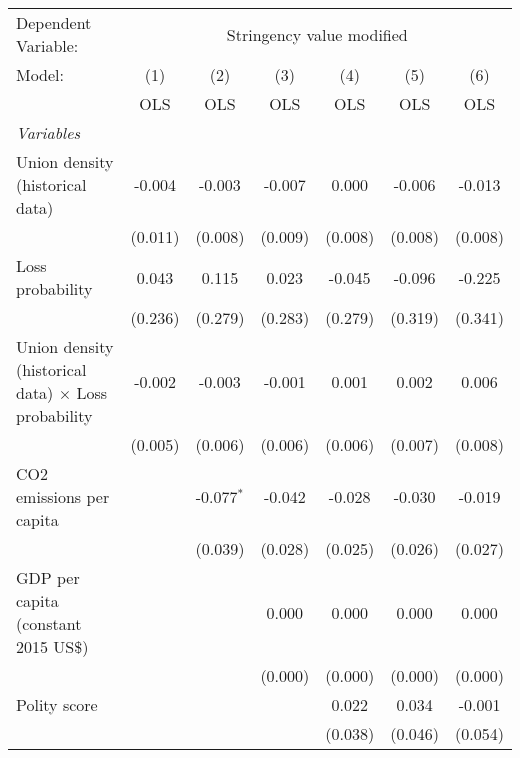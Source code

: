 
\begingroup
\centering
\begin{tabular}{lcccccc}
   \toprule
   Dependent Variable: & \multicolumn{6}{c}{Stringency value modified}\\
   Model:                                                     & (1)     & (2)          & (3)     & (4)     & (5)     & (6)\\  
                                                              &  OLS    & OLS          & OLS     & OLS     & OLS     & OLS\\  
   \midrule
   \emph{Variables}\\
   Union density (historical data)                            & -0.004  & -0.003       & -0.007  & 0.000   & -0.006  & -0.013\\   
                                                              & (0.011) & (0.008)      & (0.009) & (0.008) & (0.008) & (0.008)\\   
   Loss probability                                           & 0.043   & 0.115        & 0.023   & -0.045  & -0.096  & -0.225\\   
                                                              & (0.236) & (0.279)      & (0.283) & (0.279) & (0.319) & (0.341)\\   
   Union density (historical data) $\times$ Loss probability  & -0.002  & -0.003       & -0.001  & 0.001   & 0.002   & 0.006\\   
                                                              & (0.005) & (0.006)      & (0.006) & (0.006) & (0.007) & (0.008)\\   
   CO2 emissions per capita                                   &         & -0.077$^{*}$ & -0.042  & -0.028  & -0.030  & -0.019\\   
                                                              &         & (0.039)      & (0.028) & (0.025) & (0.026) & (0.027)\\   
   GDP per capita (constant 2015 US\$)                        &         &              & 0.000   & 0.000   & 0.000   & 0.000\\   
                                                              &         &              & (0.000) & (0.000) & (0.000) & (0.000)\\   
   Polity score                                               &         &              &         & 0.022   & 0.034   & -0.001\\   
                                                              &         &              &         & (0.038) & (0.046) & (0.054)\\   

\end{tabular}
